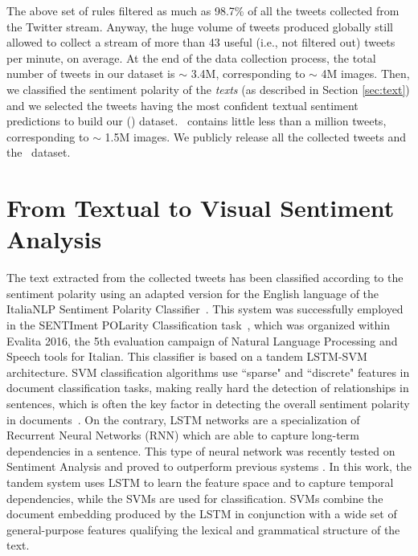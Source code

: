The above set of rules filtered as much as 98.7\% of all the tweets collected from the Twitter stream. Anyway, the huge volume of tweets produced globally still allowed to collect a stream of more than 43 useful (i.e., not filtered out) tweets per minute, on average. At the end of the data collection process, the total number of tweets in our dataset %
is $\sim$ 3.4M, corresponding to $\sim$ 4M images. Then, we classified the sentiment polarity of the \textit{texts} (as described in Section \ref{sec:text}) and we selected the tweets having the most confident textual sentiment predictions to build our \textit{\NomeTSA} (\TSA) dataset. \TSA\, contains %
little less than a million tweets, corresponding to $\sim$ 1.5M images.
We publicly release {all the collected tweets} and the \TSA\, dataset.%


\section{From Textual to Visual Sentiment Analysis}
\label{sec:vsa:method}
The text extracted from the collected tweets has been classified according to the sentiment polarity using an adapted version for the English language of the ItaliaNLP Sentiment Polarity Classifier~\cite{cimino2016tandem}.
This system was successfully employed in the SENTIment POLarity Classification task~\cite{barbieri2016overview}, which was organized within Evalita 2016, the 5th evaluation campaign of Natural Language Processing and Speech tools for Italian.
This classifier is based on a tandem LSTM-SVM architecture.
SVM classification algorithms use ``sparse" and ``discrete" features in document classification tasks, making really hard the detection of relationships in sentences, which is often the key factor in detecting the overall sentiment polarity in documents~\cite{tang2015document}.
On the contrary, LSTM networks are a specialization of Recurrent Neural Networks (RNN) which are able to capture long-term dependencies in a sentence. This type of neural network was recently tested on Sentiment Analysis and proved to outperform previous systems \cite{nakov2016semeval}.
In this work, the tandem system uses LSTM to  learn  the  feature  space and to  capture temporal dependencies, while the SVMs are used for classification.
SVMs combine the document embedding produced  by  the  LSTM  in conjunction with  a  wide  set of general-purpose features qualifying the lexical  and grammatical  structure  of  the text.


